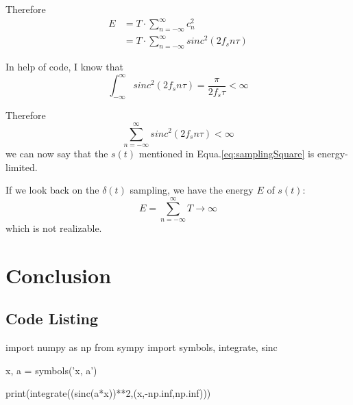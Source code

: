 \documentclass{article}
\begin{document}

Therefore
\begin{equation*}
\begin{aligned}
E &= T \cdot \sum_{n = -\infty}^{\infty} c_n^2 \\ 
&= T \cdot \sum_{n = -\infty}^{\infty} sinc^2(2f_sn\tau)
\end{aligned}
\end{equation*}

In help of code, I know that
$$
\int_{-\infty}^{\infty} sinc^2(2f_sn\tau) = \frac{\pi}{2f_s\tau} < \infty
$$

Therefore
$$
\sum_{n = -\infty}^{\infty} sinc^2(2f_sn\tau) < \infty
$$
we can now say that the $s(t)$ mentioned in Equa.\ref{eq:samplingSquare} is energy-limited.

If we look back on the $\delta(t)$ sampling, we have the energy $E$ of $s(t)$:
\begin{equation}
E = \sum_{n = -\infty}^{\infty} T \to \infty
\end{equation}
which is not realizable.

\section{Conclusion}
    \subsubsection*{}
    \subsubsection*{}

% 
% 

\begin{appendices}
    \section{Code Listing}
    \begin{python}
    import numpy as np
    from sympy import symbols, integrate, sinc

    x, a = symbols('x, a')

    print(integrate((sinc(a*x))**2,(x,-np.inf,np.inf)))
    \end{python}
\end{appendices}
\end{document}
